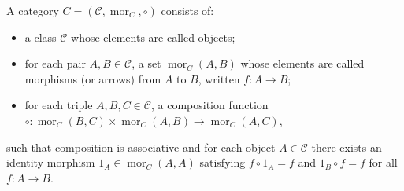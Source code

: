 A category $C = (\mathcal{C}, \operatorname{mor}_C, \circ)$ consists of:
\begin{itemize}
\item a class $\mathcal{C}$ whose elements are called objects;
\item for each pair $A, B \in \mathcal{C}$, a set $\operatorname{mor}_C(A, B)$ whose elements are called morphisms (or arrows) from $A$ to $B$, written $f: A \to B$;
\item for each triple $A, B, C \in \mathcal{C}$, a composition function $\circ: \operatorname{mor}_C(B, C) \times \operatorname{mor}_C(A, B) \to \operatorname{mor}_C(A, C)$,
\end{itemize}
such that composition is associative and for each object $A \in \mathcal{C}$ there exists an identity morphism $1_A \in \operatorname{mor}_C(A, A)$ satisfying $f \circ 1_A = f$ and $1_B \circ f = f$ for all $f: A \to B$.
